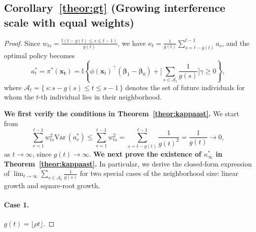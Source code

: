 \documentclass[12pt]{article}
\begin{document}
\subsection{Corollary~\ref{theor:gt} (Growing interference scale with equal weights)}
\label{app:gt}
\begin{proof}
Since $w_{ts} = \frac{\mathbb{I}(t-g(t) \le s \le t-1)}{g(t)}$, we have $\kappa_t = \frac{1}{g(t)} \sum_{s=t-g(t)}^{t-1} a_s$, 
and the optimal policy becomes  
\begin{equation*}
    a_t^\ast = \pi^\ast(\bm{x_t})
    = \mathbb{I}\!\left\{\phi(\bm{x}_t)^{\top} (\bm{\beta}_1 - \bm{\beta}_0) 
    + \Bigg[\sum_{s \in \mathcal{A}_t} \frac{1}{g(s)}\Bigg] \gamma \ge 0 \right\},
\end{equation*}
where $\mathcal{A}_t = \{\, s : s - g(s) \leq t \leq s - 1 \,\}$ denotes the set of future individuals for whom the $t$-th individual lies in their neighborhood.

\noindent
\textbf{We first verify the conditions in Theorem~\ref{theor:kappaast}.} We start from
\begin{equation}
\label{equ6}
\sum_{s=1}^{t-1} w_{ts}^2\text{Var}\,(a_s^\ast) \le \sum_{s=1}^{t-1} w_{ts}^2 = \sum_{s=t-g(t)}^{t-1} \frac{1}{g(t)^2} =\frac{1}{g(t)}\to 0, 
\end{equation}
as $t \to \infty$, since $g(t) \to \infty$. 
\textbf{We next prove the existence of $\kappa_\infty^\ast$ in Theorem~\ref{theor:kappaast}.}  
In particular, we derive the closed-form expression of $\lim_{t \to \infty}\sum_{s \in \mathcal{A}_t} \frac{1}{g(s)}$
for two special cases of the neighborhood size: linear growth and square-root growth.

\paragraph{Case 1.} $g(t) = \lfloor \rho t \rfloor$.


\end{proof}
\end{document}
